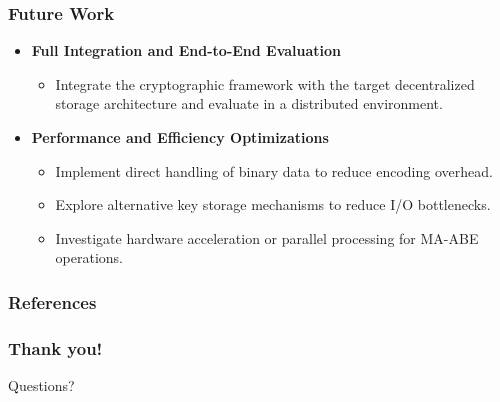 \documentclass{beamer}
\begin{document}
\begin{frame}
\frametitle{Future Work}
\begin{itemize}
    \item \textbf{Full Integration and End-to-End Evaluation}
    \begin{itemize}
        \item Integrate the cryptographic framework with the target decentralized storage architecture and evaluate in a distributed environment.
    \end{itemize}
    \item \textbf{Performance and Efficiency Optimizations}
    \begin{itemize}
        \item Implement direct handling of binary data to reduce encoding overhead.
        \item Explore alternative key storage mechanisms to reduce I/O bottlenecks.
        \item Investigate hardware acceleration or parallel processing for MA-ABE operations.
    \end{itemize}
\end{itemize}
\end{frame}

\begin{frame}[allowframebreaks]
\frametitle{References}

\end{frame}

\begin{frame}
\frametitle{Thank you!}
\begin{center}
\Large Questions?
\end{center}
\vspace{2cm}
\InfContacts
\end{frame}
\end{document}
